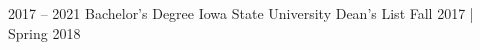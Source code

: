 \documentclass[9pt]{developercv} %
\begin{document}
\begin{minipage}[t]{0.5\textwidth} %
	\vspace{-\baselineskip} %
	\begin{barchart}{5.5}


	\end{barchart}
\end{minipage}
\begin{minipage}[t]{0.5\textwidth} %
	\vspace{-\baselineskip} %
	\begin{barchart}{5.5}


	\end{barchart}
\end{minipage}





\begin{entrylist}
	\entry
		{2017 -- 2021}
		{Bachelor's Degree}
		{Iowa State University}
		{Dean's List Fall 2017 | Spring 2018}
\end{entrylist}


\end{document}
